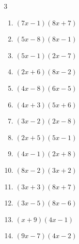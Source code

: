\begin{multicols}{3}
\begin{enumerate}

  \item $(7x-1)(8x+7)$


  \item $(5x-8)(8x-1)$


  \item $(5x-1)(2x-7)$


  \item $(2x+6)(8x-2)$


  \item $(4x-8)(6x-5)$


\columnbreak %

  \item $(4x+3)(5x+6)$


  \item $(3x-2)(2x-8)$


  \item $(2x+5)(5x-1)$


  \item $(4x-1)(2x+8)$


  \item $(8x-2)(3x+2)$


  \item $(3x+3)(8x+7)$


  \item $(3x-5)(8x-6)$


  \item $(x+9)(4x-1)$


  \item $(9x-7)(4x-2)$



\end{enumerate}
\end{multicols}
